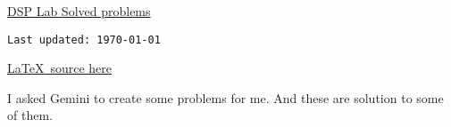 \documentclass[11pt,a4paper]{article}
\newcommand{\note}[1]{%
	\begin{tcolorbox}[colframe=orange!75!black]
		#1
	\end{tcolorbox}
}
\begin{document}
\begin{center}
	{\Huge \normalfont \underline{DSP Lab Solved problems}}
	
	\vspace*{10pt}
	\texttt{Last updated: \today\ \DTMcurrenttime}
	
	\href{https://github.com/roopeshor/tex-works/tree/main/Lab\%20Programs/DSP}{\LaTeX\ source here}
	\vspace*{10pt}
\end{center}
\note{I asked Gemini to create some problems for me. And these are solution to some of them.}
\begin{center}
	{\let\clearpage\relax \tableofcontents}
\end{center}



{}
\setlength{\parindent}{0pt}






\end{document}
